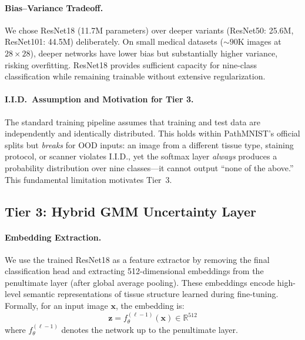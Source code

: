 \documentclass{article}
\begin{document}
\paragraph{Bias--Variance Tradeoff.}
We chose ResNet18 (11.7M parameters) over deeper variants (ResNet50: 25.6M, ResNet101: 44.5M) deliberately. On small medical datasets (${\sim}90$K images at $28 \times 28$), deeper networks have lower bias but substantially higher variance, risking overfitting. ResNet18 provides sufficient capacity for nine-class classification while remaining trainable without extensive regularization.

\paragraph{I.I.D.\ Assumption and Motivation for Tier 3.}
The standard training pipeline assumes that training and test data are independently and identically distributed. This holds within PathMNIST's official splits but \emph{breaks} for OOD inputs: an image from a different tissue type, staining protocol, or scanner violates I.I.D., yet the softmax layer \emph{always} produces a probability distribution over nine classes---it cannot output ``none of the above.'' This fundamental limitation motivates Tier~3.

\subsection{Tier 3: Hybrid GMM Uncertainty Layer}
\label{sec:gmm}

\paragraph{Embedding Extraction.}
We use the trained ResNet18 as a feature extractor by removing the final classification head and extracting 512-dimensional embeddings from the penultimate layer (after global average pooling). These embeddings encode high-level semantic representations of tissue structure learned during fine-tuning. Formally, for an input image $\mathbf{x}$, the embedding is:
\begin{equation}
    \mathbf{z} = f_\theta^{(\ell-1)}(\mathbf{x}) \in \mathbb{R}^{512}
    \label{eq:embedding}
\end{equation}
where $f_\theta^{(\ell-1)}$ denotes the network up to the penultimate layer.
\end{document}
